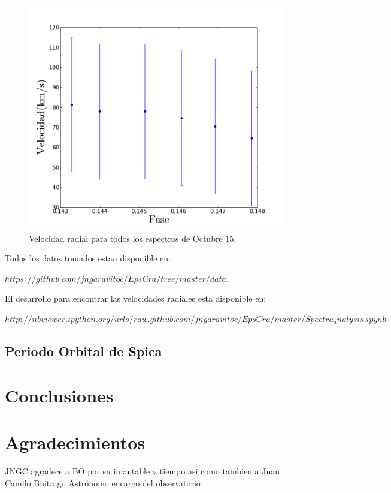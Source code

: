\documentclass[Proceedings]{ascelike}
\begin{document}
\begin{figure}
\includegraphics[scale=0.5]{velocidadvsfase.png}
\caption{Velocidad radial para todos los espectros de Octubre 15. \label{vvsfase}}
\end{figure}


Todos los datos tomados estan disponible en:

$ https://github.com/jngaravitoc/EpsCra/tree/master/data.$

El desarrollo para encontrar las velocidades radiales esta 
disponible en:

$http://nbviewer.ipython.org/urls/raw.github.com/jngaravitoc/EpsCra/master/Spectra_analysis.ipynb
$
\subsection{Periodo Orbital de Spica}


\section{Conclusiones}

\section{Agradecimientos}

JNGC agradece a BO por su infantable y tiempo
asi como tambien a Juan Camilo Buitrago Astr\'onomo encargo
del observatorio  
\end{document}
